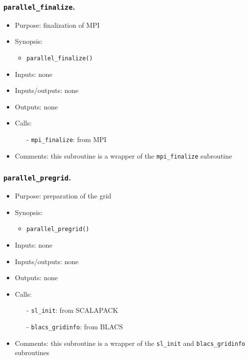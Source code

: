 \documentclass[12pt]{article}
\begin{document}
\subsubsection{{\tt parallel\_finalize}.}
\begin{itemize}
\item Purpose: finalization of MPI
\item Synopsis: 
\begin{itemize}
\item {\tt parallel\_finalize()}
\end{itemize}
\item Inputs: none
\item Inputs/outputs: none
\item Outputs: none
\item Calls: 
\begin{itemize}
\item[-] {\tt mpi\_finalize}: from MPI
\end{itemize}
\item Comments: this subroutine is a wrapper of the {\tt mpi\_finalize} subroutine
\end{itemize} 

\subsubsection{{\tt parallel\_pregrid}.}
\begin{itemize}
\item Purpose: preparation of the grid
\item Synopsis: 
\begin{itemize}
\item {\tt parallel\_pregrid()}
\end{itemize}
\item Inputs: none
\item Inputs/outputs: none
\item Outputs: none
\item Calls: 
\begin{itemize}
\item[-] {\tt sl\_init}: from SCALAPACK
\item[-] {\tt blacs\_gridinfo}: from BLACS
\end{itemize}
\item Comments: this subroutine is a wrapper of the {\tt sl\_init} and {\tt blacs\_gridinfo} subroutines
\end{itemize} 
\end{document}
